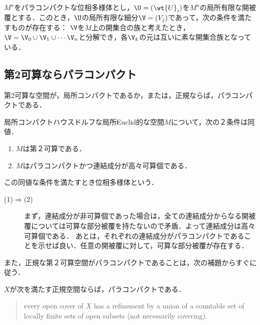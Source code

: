 \documentclass[uplatex,dvipdfmx]{jsreport}
\begin{document}
\begin{theorem}[パラコンパクト多様体の開被覆]\label{thm-open-cover-of-paracompact-locally-Euclidean-space}
    $M^n$をパラコンパクトな位相多様体とし，$\U=(\wt{U}_i)$を$M^n$の局所有限な開被覆とする．このとき，$\U$の局所有限な細分$\V=(V_j)$であって，次の条件を満たすものが存在する：
    $\V$を$M$上の開集合の族と考えたとき，$\V=\V_0\cup\V_1\cup\cdots\V_n$と分解でき，各$\V_k$の元は互いに素な開集合族となっている．
\end{theorem}

\subsection{第2可算ならパラコンパクト}

\begin{tcolorbox}[colframe=ForestGreen, colback=ForestGreen!10!white,breakable,colbacktitle=ForestGreen!40!white,coltitle=black,fonttitle=\bfseries\sffamily,
title=]
    第2可算な空間が，局所コンパクトであるか，または，正規ならば，パラコンパクトである．
\end{tcolorbox}

\begin{corollary}
    局所コンパクトハウスドルフな局所Euclid的な空間$M$について，次の２条件は同値．
    \begin{enumerate}
        \item $M$は第２可算である．
        \item $M$はパラコンパクトかつ連結成分が高々可算個である．
    \end{enumerate}
    この同値な条件を満たすとき位相多様体という．
\end{corollary}
\begin{Proof}\mbox{}
    \begin{description}
        \item[(1)$\Rightarrow$(2)] まず，連結成分が非可算個であった場合は，全ての連結成分からなる開被覆については可算な部分被覆を持たないので矛盾．よって連結成分は高々可算個である．
        あとは，それぞれの連結成分がパラコンパクトであることを示せば良い．任意の開被覆に対して，可算な部分被覆が存在する．
    \end{description}
\end{Proof}

また，正規な第２可算空間がパラコンパクトであることは，次の補題からすぐに従う．

\begin{lemma}
    $X$が次を満たす正規空間ならば，パラコンパクトである．
    \begin{quote}
        every open cover of $X$ has a refinement by a union of a countable set of locally finite sets of open subsets (not necessarily covering).
    \end{quote}
\end{lemma}
\end{document}
